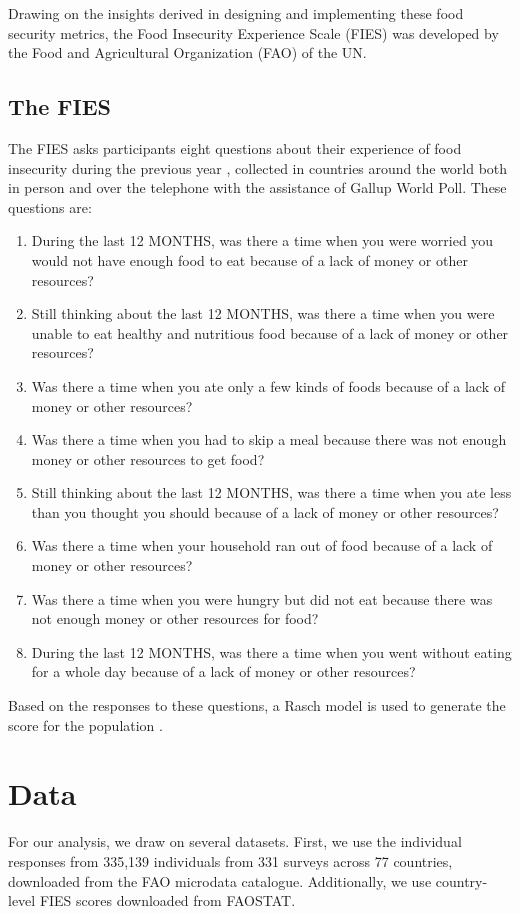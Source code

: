 \documentclass{article}
\begin{document}
Drawing on the insights derived in designing and implementing these food security metrics, the Food Insecurity Experience Scale (FIES) was developed by the Food and Agricultural Organization (FAO) of the UN.

\subsection{The FIES}
The FIES asks participants eight questions about their experience of food insecurity during the previous year \cite{Cafiero2018}, collected in countries around the world both in person and over the telephone with the assistance of Gallup World Poll.  These questions are:

\begin{enumerate}
	\item During the last 12 MONTHS, was there a time when you were worried you would not have enough food to eat because of a lack of money or other resources?
	\item Still thinking about the last 12 MONTHS, was there a time when you were unable to eat healthy and nutritious food because of a lack of money or other resources?
	\item Was there a time when you ate only a few kinds of foods because of a lack of money or other resources?
	\item Was there a time when you had to skip a meal because there was not enough money or other resources to get food?
	\item Still thinking about the last 12 MONTHS, was there a time when you ate less than you thought you should because of a lack of money or other resources?
	\item Was there a time when your household ran out of food because of a lack of money or other resources?
	\item Was there a time when you were hungry but did not eat because there was not enough money or other resources for food?
	\item During the last 12 MONTHS, was there a time when you went without eating for a whole day because of a lack of money or other resources?
\end{enumerate}

Based on the responses to these questions, a Rasch model is used to generate the score for the population \cite{Engelhard2013}.  

\section{Data}
For our analysis, we draw on several datasets.  First, we use the individual responses from 335,139 individuals from 331 surveys across 77 countries, downloaded from the FAO microdata catalogue.  Additionally, we use country-level FIES scores downloaded from FAOSTAT.
\end{document}

